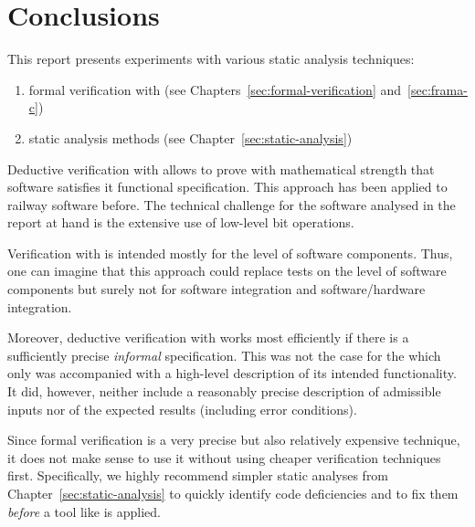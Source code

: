 
\chapter{Conclusions}
\label{sec:conclusions}

This report presents experiments with various static analysis techniques:

\begin{enumerate}
\item formal verification with \framacwp (see Chapters~\ref{sec:formal-verification}
      and~\ref{sec:frama-c})
\item static analysis methods (see Chapter~\ref{sec:static-analysis})
\end{enumerate}


Deductive verification with \framacwp allows to prove with mathematical strength
that software satisfies it functional specification.
This approach has been applied to railway software before\cite{DBLP:conf/indin/PrevostoBGHPV13}.
The technical challenge for the software analysed in the report at hand is
the extensive use of low-level bit operations.

Verification with \framacwp is intended mostly for the level of software components.
Thus, one can imagine that this approach could replace tests on the 
level of software components but surely not for software integration
and software\slash hardware integration.

Moreover, deductive verification with \framacwp works most efficiently
if there is a sufficiently precise \emph{informal} specification.
This was not the case for the \bitwalker which only was accompanied with
a high-level description of its intended functionality.
It did, however, neither include a reasonably precise description of admissible inputs
nor of the expected results (including error conditions).

Since formal verification is a very precise but also relatively expensive technique,
it does not make sense to use it without using cheaper verification techniques first.
Specifically, we highly recommend  simpler static analyses from 
Chapter~\ref{sec:static-analysis} to quickly identify code deficiencies
and to fix them \emph{before} a tool like \framacwp is applied.


